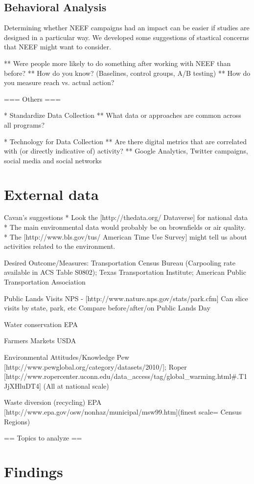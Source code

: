 \documentclass{article}
\begin{document}
\subsection{Behavioral Analysis}
Determining whether NEEF campaigns had an impact
can be easier if studies are designed in a particular way.
We developed some suggestions of stastical concerns that
NEEF might want to consider.

** Were people more likely to do something after working with NEEF than before?
** How do you know?  (Baselines, control groups, A/B testing)
** How do you measure reach vs. actual action?

=== Others ===

* Standardize Data Collection
** What data or approaches are common across all programs?

* Technology for Data Collection
** Are there digital metrics that are correlated with (or directly indicative of) activity? 
** Google Analytics, Twitter campaigns, social media and social networks


\section{External data}
Cavan's suggestions
* Look the [http://thedata.org/ Dataverse] for national data
* The main environmental data would probably be on brownfields or air quality.
* The [http://www.bls.gov/tus/ American Time Use Survey] might tell us about activities related to the environment.


Desired Outcome/Measures:
Transportation
Census Bureau (Carpooling rate available in ACS Table S0802); Texas Transportation Institute; American Public Transportation Association
 
Public Lands Visits
 NPS - [http://www.nature.nps.gov/stats/park.cfm]
Can slice visits by state, park, etc
Compare before/after/on Public Lands Day


Water conservation
EPA
 
Farmers Markets
USDA
 
Environmental Attitudes/Knowledge
Pew [http://www.pewglobal.org/category/datasets/2010/]; Roper [http://www.ropercenter.uconn.edu/data_access/tag/global_warming.html#.T1JjXHluDT4] (All at national scale)
 
Waste diversion (recycling)
EPA [http://www.epa.gov/osw/nonhaz/municipal/msw99.htm](finest scale= Census Regions)

== Topics to analyze ==

\section{Findings}
\end{document}
